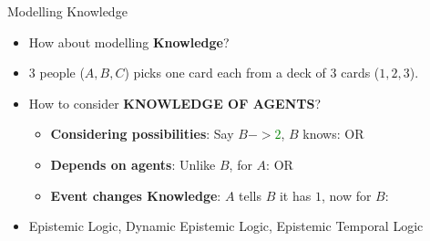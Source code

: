 \documentclass[usenames,dvipsnames]{beamer}
\begin{document}
\begin{frame}{Modelling Knowledge}
    \begin{itemize}
    \setlength\itemsep{1em}
        \item<1-> How about modelling \textbf{Knowledge}?

        \item<2-> 3 people ($A, B, C$) picks one card each from a deck of 3 cards ($1, 2, 3$).

        \item<3-> How to consider \textbf{KNOWLEDGE OF AGENTS}?
        \begin{itemize}
        \setlength\itemsep{1em}
            \item<4-> \textbf{Considering possibilities}: Say $B -> $\textcolor{green}{$2$}, $B$ knows:  OR 

            \item<5-> \textbf{Depends on agents}: Unlike $B$, for $A$:  OR  

            \item<6-> \textbf{Event changes Knowledge}: $A$ tells $B$ it has $1$, now for $B$: 
        \end{itemize}

        \item<7-> Epistemic Logic, Dynamic Epistemic Logic, Epistemic Temporal Logic
    \end{itemize}
\end{frame}
\end{document}
